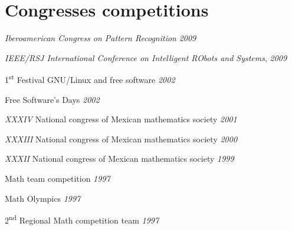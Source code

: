 \section{Congresses competitions} \begin{loneinnerlist}
  \item \emph{Iberoamerican Congress on Pattern Recognition} \hfill{\emph{2009}}
  \item \emph{IEEE/RSJ International Conference on Intelligent RObots
        and Systems}, \hfill{\emph{2009}}
  \item 1\textsuperscript{st} Festival GNU/Linux and free software 
        \hfill{\emph{2002}}
  \item Free Software's Days \hfill{\emph{2002}}
  \item \emph{XXXIV} National congress of Mexican mathematics society
        \hfill{\emph{2001}}
  \item \emph{XXXIII} National congress of Mexican mathematics society
        \hfill{\emph{2000}}
  \item \emph{XXXII} National congress of Mexican mathematics society
        \hfill{\emph{1999}}
  \item Math team competition \hfill{\emph{1997}}
  \item Math Olympics \hfill{\emph{1997}}
  \item 2\textsuperscript{nd} Regional Math competition team 
        \hfill{\emph{1997}}
\end{loneinnerlist}




